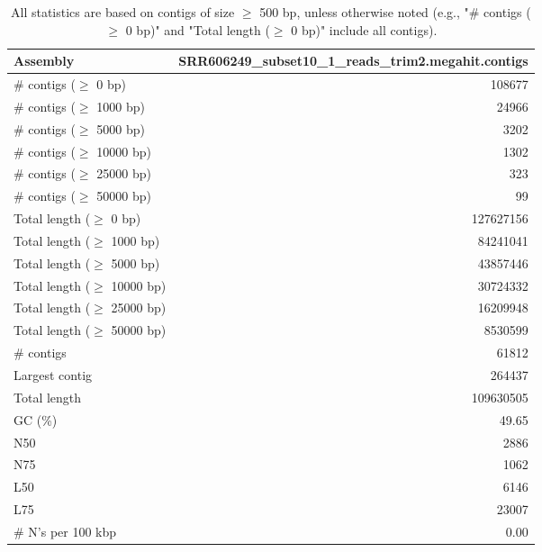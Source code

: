 \documentclass[12pt,a4paper]{article}
\begin{document}
\begin{table}[ht]
\begin{center}
\caption{All statistics are based on contigs of size $\geq$ 500 bp, unless otherwise noted (e.g., "\# contigs ($\geq$ 0 bp)" and "Total length ($\geq$ 0 bp)" include all contigs).}
\begin{tabular}{|l*{1}{|r}|}
\hline
Assembly & SRR606249\_subset10\_1\_reads\_trim2.megahit.contigs \\ \hline
\# contigs ($\geq$ 0 bp) & 108677 \\ \hline
\# contigs ($\geq$ 1000 bp) & 24966 \\ \hline
\# contigs ($\geq$ 5000 bp) & 3202 \\ \hline
\# contigs ($\geq$ 10000 bp) & 1302 \\ \hline
\# contigs ($\geq$ 25000 bp) & 323 \\ \hline
\# contigs ($\geq$ 50000 bp) & 99 \\ \hline
Total length ($\geq$ 0 bp) & 127627156 \\ \hline
Total length ($\geq$ 1000 bp) & 84241041 \\ \hline
Total length ($\geq$ 5000 bp) & 43857446 \\ \hline
Total length ($\geq$ 10000 bp) & 30724332 \\ \hline
Total length ($\geq$ 25000 bp) & 16209948 \\ \hline
Total length ($\geq$ 50000 bp) & 8530599 \\ \hline
\# contigs & 61812 \\ \hline
Largest contig & 264437 \\ \hline
Total length & 109630505 \\ \hline
GC (\%) & 49.65 \\ \hline
N50 & 2886 \\ \hline
N75 & 1062 \\ \hline
L50 & 6146 \\ \hline
L75 & 23007 \\ \hline
\# N's per 100 kbp & 0.00 \\ \hline
\end{tabular}
\end{center}
\end{table}
\end{document}
